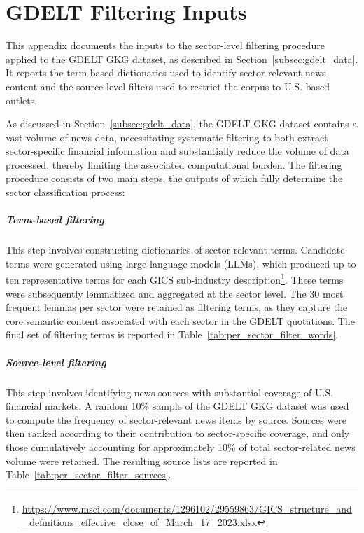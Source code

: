 \chapter{GDELT Filtering Inputs}


\begin{introduction}
This appendix documents the inputs to the sector-level filtering procedure applied to the GDELT GKG dataset, as described in Section~\ref{subsec:gdelt_data}. It reports the term-based dictionaries used to identify sector-relevant news content and the source-level filters used to restrict the corpus to U.S.-based outlets.
\end{introduction}


As discussed in Section~\ref{subsec:gdelt_data}, the GDELT GKG dataset contains a vast volume of news data, necessitating systematic filtering to both extract sector-specific financial information and substantially reduce the volume of data processed, thereby limiting the associated computational burden. The filtering procedure consists of two main steps, the outputs of which fully determine the sector classification process:

\paragraph{Term-based filtering} This step involves constructing dictionaries of sector-relevant terms. Candidate terms were generated using large language models (LLMs), which produced up to ten representative terms for each GICS sub-industry description\footnote{\url{https://www.msci.com/documents/1296102/29559863/GICS_structure_and_definitions_effective_close_of_March_17_2023.xlsx}}. These terms were subsequently lemmatized and aggregated at the sector level. The 30 most frequent lemmas per sector were retained as filtering terms, as they capture the core semantic content associated with each sector in the GDELT quotations. The final set of filtering terms is reported in Table~\ref{tab:per_sector_filter_words}.

\paragraph{Source-level filtering} This step involves identifying news sources with substantial coverage of U.S. financial markets. A random 10\% sample of the GDELT GKG dataset was used to compute the frequency of sector-relevant news items by source. Sources were then ranked according to their contribution to sector-specific coverage, and only those cumulatively accounting for approximately 10\% of total sector-related news volume were retained. The resulting source lists are reported in Table~\ref{tab:per_sector_filter_sources}.


